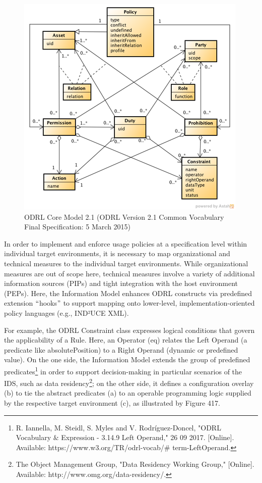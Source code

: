 \begin{figure}[H]
	\begin{Center}
		\includegraphics[width=4.36in,height=4.24in]{./media/image72.png}
		\caption{ODRL Core Model 2.1 (ODRL Version 2.1 Common Vocabulary Final Specification: 5 March 2015)}
		\label{fig:odrl}
	\end{Center}
\end{figure}



In order to implement and enforce usage policies at a specification level within individual target environments, it is necessary to map organizational and technical measures to the individual target environments. While organizational measures are out of scope here, technical measures involve a variety of additional information sources (PIPs) and tight integration with the host environment (PEPs). Here, the Information Model enhances ODRL constructs via predefined extension $``$hooks$"$  to support mapping onto lower-level, implementation-oriented policy languages (e.g., IND²UCE XML).


For example, the ODRL Constraint class expresses logical conditions that govern the applicability of a Rule. Here, an Operator (eq) relates the Left Operand (a predicate like absolutePosition) to a Right Operand (dynamic or predefined value). On the one side, the Information Model extends the group of predefined predicates\footnote{ R. Iannella, M. Steidl, S. Myles and V. Rodríguez-Doncel, "ODRL Vocabulary $\&$  Expression - 3.14.9 Left Operand," 26 09 2017. [Online]. Available: https://www.w3.org/TR/odrl-vocab/$\#$ term-LeftOperand.  } in order to support decision-making in particular scenarios of the IDS, such as data residency\footnote{ The Object Management Group, "Data Residency Working Group," [Online]. Available: http://www.omg.org/data-residency/.  }; on the other side, it defines a configuration overlay (b) to tie the abstract predicates (a) to an operable programming logic supplied by the respective target environment (c), as illustrated by Figure 417.



